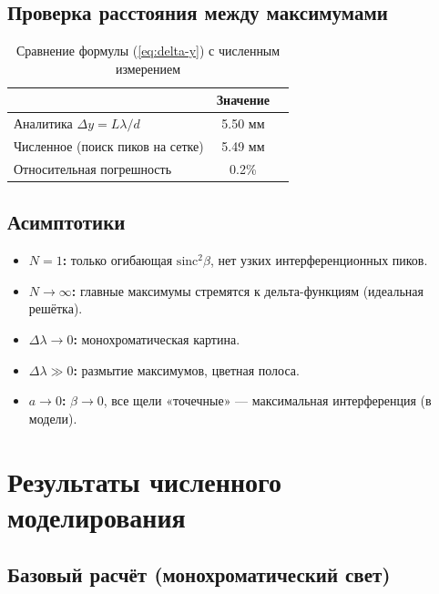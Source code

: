 \documentclass[12pt,a4paper]{article}
\begin{document}
\subsection{Проверка расстояния между максимумами}

\begin{table}[H]
\centering
\caption{Сравнение формулы (\ref{eq:delta-y}) с численным измерением}
\begin{tabular}{@{}lcc@{}}
\toprule
 & Значение \\
\midrule
Аналитика \(\Delta y=L\lambda/d\) & 5.50 мм \\
Численное (поиск пиков на сетке) & 5.49 мм \\
Относительная погрешность & 0.2\% \\
\bottomrule
\end{tabular}
\end{table}

\subsection{Асимптотики}

\begin{itemize}
  \item \textbf{\(N=1\):} только огибающая \(\mathrm{sinc}^2\beta\), нет узких
        интерференционных пиков.
  \item \textbf{\(N\to\infty\):} главные максимумы стремятся к дельта-функциям
        (идеальная решётка).
  \item \textbf{\(\Delta\lambda\to0\):} монохроматическая картина.
  \item \textbf{\(\Delta\lambda\gg0\):} размытие максимумов, цветная полоса.
  \item \textbf{\(a\to0\):} \(\beta\to0\), все щели «точечные» --- максимальная
        интерференция (в модели).
\end{itemize}

\section{Результаты численного моделирования}

\subsection{Базовый расчёт (монохроматический свет)}
\end{document}
